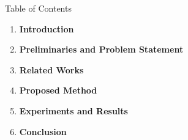 \documentclass[aspectratio=169,9pt]{beamer}
\begin{document}
\begin{frame}{Table of Contents}
  \vspace{0.4cm}
  \begin{enumerate}[\bfseries 1]
    \setlength{\itemsep}{0.35cm}
    \item \textbf{\color{bkblue} Introduction}
    \item \textbf{\color{bkblue} Preliminaries and Problem Statement}
    \item \textbf{\color{bkblue} Related Works}
    \item \textbf{\color{bkblue} Proposed Method}
    \item \textbf{\color{bkblue} Experiments and Results}
    \item \textbf{\color{bkblue} Conclusion}
  \end{enumerate}
\end{frame}
\end{document}
